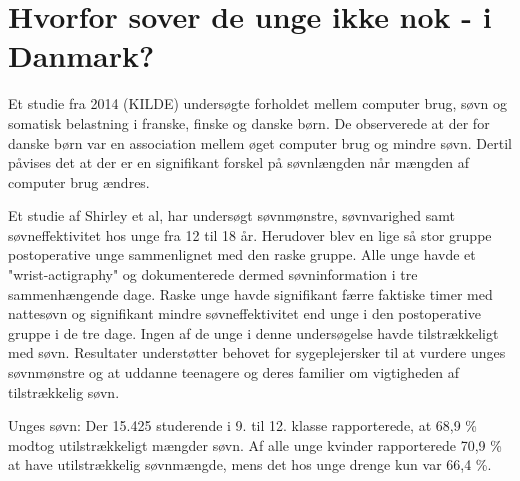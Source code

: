 \section{Hvorfor sover de unge ikke nok - i Danmark?}
\label{sec:hvorforSoverDeUngeIkkeNok}

Et studie fra 2014 (KILDE) undersøgte forholdet mellem computer brug, søvn og somatisk belastning i franske, finske og danske børn. De observerede at der for danske børn var en association mellem øget computer brug og mindre søvn. Dertil påvises det at der er en signifikant forskel på søvnlængden når mængden af computer brug ændres.


Et studie af Shirley et al, har undersøgt søvnmønstre, søvnvarighed samt søvneffektivitet hos unge fra 12 til 18 år. Herudover blev en lige så stor gruppe postoperative unge sammenlignet med den raske gruppe.  
Alle unge havde et "wrist-actigraphy" og dokumenterede dermed søvninformation i tre sammenhængende dage. 
Raske unge havde signifikant færre faktiske timer med nattesøvn og signifikant mindre søvneffektivitet end unge i den postoperative gruppe i de tre dage. Ingen af de unge i denne undersøgelse havde tilstrækkeligt med søvn. 
Resultater understøtter behovet for sygeplejersker til at vurdere unges søvnmønstre og at uddanne teenagere og deres familier om vigtigheden af tilstrækkelig søvn. 



Unges søvn: 
Der
15.425 studerende i 9. til 12. klasse rapporterede, at 68,9  \% modtog utilstrækkeligt mængder søvn. Af alle unge kvinder rapporterede 70,9 \% at have utilstrækkelig søvnmængde, mens det hos unge drenge kun var 66,4 \%. 



